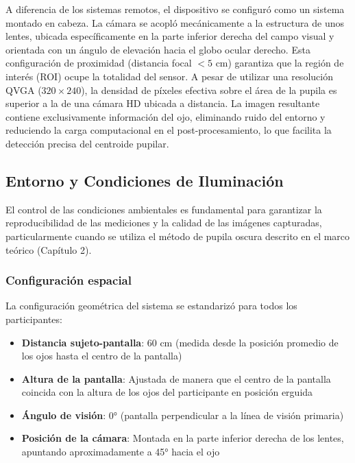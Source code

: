 A diferencia de los sistemas remotos, el dispositivo se configuró como un sistema montado en cabeza.
La cámara se acopló mecánicamente a la estructura de unos lentes, ubicada específicamente en la parte inferior derecha del campo visual y orientada con un ángulo de elevación hacia el globo ocular derecho.
Esta configuración de proximidad (distancia focal $< 5$ cm) garantiza que la región de interés (ROI) ocupe la totalidad del sensor.
A pesar de utilizar una resolución QVGA ($320 \times 240$), la densidad de píxeles efectiva sobre el área de la pupila es superior a la de una cámara HD ubicada a distancia.
La imagen resultante contiene exclusivamente información del ojo, eliminando ruido del entorno y reduciendo la carga computacional en el post-procesamiento, lo que facilita la detección precisa del centroide pupilar.

\subsection{Entorno y Condiciones de Iluminación}

El control de las condiciones ambientales es fundamental para garantizar la reproducibilidad de las mediciones y la calidad de las imágenes capturadas, particularmente cuando se utiliza el método de pupila oscura descrito en el marco teórico (Capítulo 2).

\subsubsection{Configuración espacial}

La configuración geométrica del sistema se estandarizó para todos los participantes:

\begin{itemize}
	\item \textbf{Distancia sujeto-pantalla}: 60 cm (medida desde la posición promedio de los ojos hasta el centro de la pantalla)
	\item \textbf{Altura de la pantalla}: Ajustada de manera que el centro de la pantalla coincida con la altura de los ojos del participante en posición erguida
	\item \textbf{Ángulo de visión}: 0° (pantalla perpendicular a la línea de visión primaria)
	\item \textbf{Posición de la cámara}: Montada en la parte inferior derecha de los lentes, apuntando aproximadamente a 45° hacia el ojo
\end{itemize}

